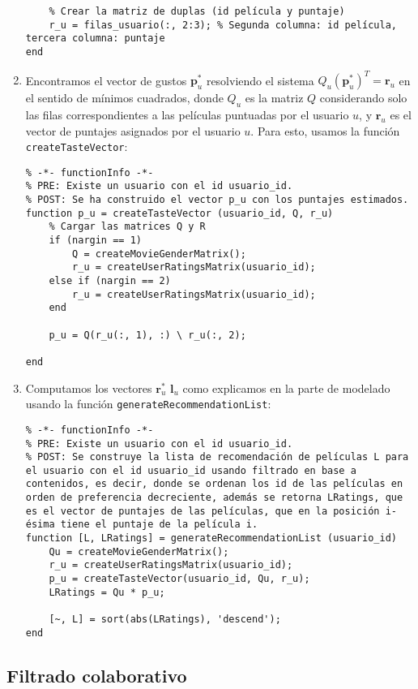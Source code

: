 \documentclass[12pt,a4paper]{article}
\begin{document}
\begin{enumerate}
\begin{lstlisting}
    % Crear la matriz de duplas (id película y puntaje)
    r_u = filas_usuario(:, 2:3); % Segunda columna: id película, tercera columna: puntaje
end
  \end{lstlisting}
  \item Encontramos el vector de gustos \(\mathbf{p}^*_u\) resolviendo el sistema \(Q_u(\mathbf{p}^*_u)^T = \mathbf{r}_u\) en el sentido de mínimos cuadrados, donde \(Q_u\) es la matriz \(Q\) considerando solo las filas correspondientes a las películas puntuadas por el usuario \(u\), y \(\mathbf{r}_u\) es el vector de puntajes asignados por el usuario \(u\). Para esto, usamos la función \texttt{createTasteVector}:
        \begin{lstlisting}
% -*- functionInfo -*-
% PRE: Existe un usuario con el id usuario_id.
% POST: Se ha construido el vector p_u con los puntajes estimados.
function p_u = createTasteVector (usuario_id, Q, r_u)
    % Cargar las matrices Q y R
    if (nargin == 1)
        Q = createMovieGenderMatrix();
        r_u = createUserRatingsMatrix(usuario_id);
    else if (nargin == 2)
        r_u = createUserRatingsMatrix(usuario_id);
    end

    p_u = Q(r_u(:, 1), :) \ r_u(:, 2);

end
  \end{lstlisting}
  \item Computamos los vectores \(\mathbf{r}^*_u\) \(\mathbf{l}_u\) como explicamos en la parte de modelado usando la función \texttt{generateRecommendationList}:
        \begin{lstlisting}
% -*- functionInfo -*-
% PRE: Existe un usuario con el id usuario_id.
% POST: Se construye la lista de recomendación de películas L para el usuario con el id usuario_id usando filtrado en base a contenidos, es decir, donde se ordenan los id de las películas en orden de preferencia decreciente, además se retorna LRatings, que es el vector de puntajes de las películas, que en la posición i-ésima tiene el puntaje de la película i.
function [L, LRatings] = generateRecommendationList (usuario_id)
    Qu = createMovieGenderMatrix();
    r_u = createUserRatingsMatrix(usuario_id);
    p_u = createTasteVector(usuario_id, Qu, r_u);
    LRatings = Qu * p_u;

    [~, L] = sort(abs(LRatings), 'descend');
end
  \end{lstlisting}
\end{enumerate}

\subsection*{Filtrado colaborativo}
\end{document}
